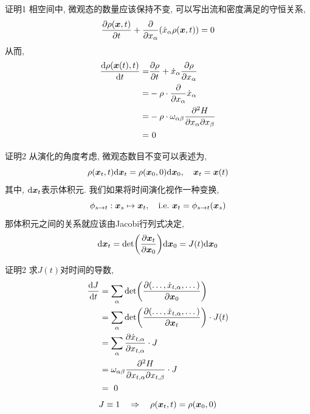 \documentclass[aspectratio=169]{wzbeamer}
\begin{document}
    \begin{frame}{证明1}
        相空间中, 微观态的数量应该保持不变, 可以写出流和密度满足的守恒关系,
        \begin{equation}
            \pdv{\rho(\vb*x, t)}{t} + \pdv{x_\alpha}(\dot x_\alpha \rho(\vb*x,t) ) = 0
        \end{equation}
        从而,
        \begin{equation}
            \begin{split}
                \dv{\rho(\vb*x(t),t)}{t} =& \pdv{\rho}{t} + \dot x_\alpha \pdv{\rho}{x_\alpha}\\
                =& - \rho\cdot \pdv{x_\alpha}\dot x_\alpha\\
                =& - \rho\cdot \omega_{\alpha\beta} \pdv{H}{x_\alpha}{x_\beta}\\
                =& \ 0
            \end{split}
        \end{equation}
    \end{frame}
    \begin{frame}{证明2}
        从演化的角度考虑, 微观态数目不变可以表述为,
        \begin{equation}
            \rho(\vb*x_t,t) \dd\vb*x_t = \rho(\vb*x_0,0) \dd\vb*x_0, \quad\vb*x_t = \vb*x(t)
        \end{equation}
        其中, $\dd\vb*x_t$表示体积元. 我们如果将时间演化视作一种变换, 
        \begin{equation}
            \phi_{s\to t} : \vb*x_s \mapsto \vb*x_t,\quad \text{i.e.}\ \vb*x_t = \phi_{s\to t} (\vb*x_s)
        \end{equation}
        那体积元之间的关系就应该由Jacobi行列式决定,
        \begin{equation}
            \dd\vb*x_t = \det(\pdv{\vb*x_t}{\vb*x_0}) \dd\vb*x_0 = J(t) \dd\vb*x_0
        \end{equation}
    \end{frame}
    \begin{frame}{证明2}
        求$J(t)$对时间的导数,
        \begin{equation}
            \begin{split}
                \dv{J}{t} &= \sum_\alpha \det(\pdv{(\dots ,\dot x_{t, \alpha}, \dots)}{\vb*x_0})\\
                &= \sum_\alpha \det(\pdv{(\dots ,\dot x_{t,\alpha}, \dots)}{\vb*x_t}) \cdot J(t)\\
                &= \sum_\alpha \pdv{\dot x_{t, \alpha}}{x_{t,\alpha}}\cdot J\\
                &= \omega_{\alpha\beta} \pdv{H}{x_{t,\alpha}}{x_{t,\beta}}\cdot J\\
                &= \ 0
            \end{split}
        \end{equation}
        $$ J \equiv 1 \quad \Rightarrow\quad \rho(\vb*x_t, t) = \rho(\vb*x_0, 0)$$ 
    \end{frame}
\end{document}
